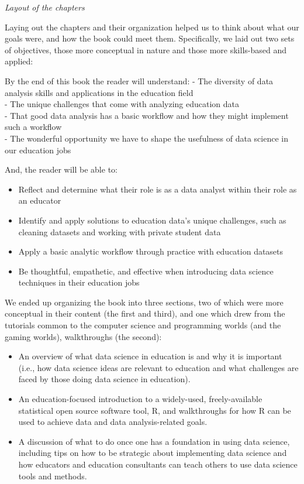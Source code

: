 \documentclass[
  english,
  man]{apa6}
\providecommand{\tightlist}{%
  \setlength{\itemsep}{0pt}\setlength{\parskip}{0pt}}
\begin{document}
\emph{Layout of the chapters}

Laying out the chapters and their organization helped us to think about what our goals were, and how the book could meet them. Specifically, we laid out two sets of objectives, those more conceptual in nature and those more skills-based and applied:

By the end of this book the reader will understand:
- The diversity of data analysis skills and applications in the education field\\
- The unique challenges that come with analyzing education data\\
- That good data analysis has a basic workflow and how they might implement such a workflow\\
- The wonderful opportunity we have to shape the usefulness of data science in our education jobs

And, the reader will be able to:

\begin{itemize}
\tightlist
\item
  Reflect and determine what their role is as a data analyst within their role as an educator\\
\item
  Identify and apply solutions to education data's unique challenges, such as cleaning datasets and working with private student data\\
\item
  Apply a basic analytic workflow through practice with education datasets\\
\item
  Be thoughtful, empathetic, and effective when introducing data science techniques in their education jobs
\end{itemize}

We ended up organizing the book into three sections, two of which were more conceptual in their content (the first and third), and one which drew from the tutorials common to the computer science and programming worlds (and the gaming worlds), walkthroughs (the second):

\begin{itemize}
\tightlist
\item
  An overview of what data science in education is and why it is important (i.e., how data science ideas are relevant to education and what challenges are faced by those doing data science in education).
\item
  An education-focused introduction to a widely-used, freely-available statistical open source software tool, R, and walkthroughs for how R can be used to achieve data and data analysis-related goals.
\item
  A discussion of what to do once one has a foundation in using data science, including tips on how to be strategic about implementing data science and how educators and education consultants can teach others to use data science tools and methods.
\end{itemize}
\end{document}
